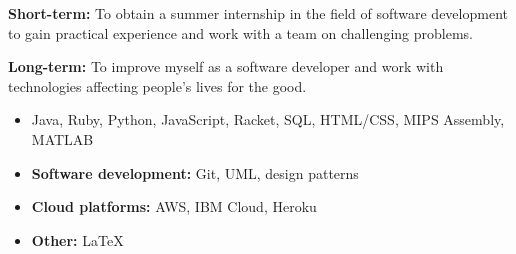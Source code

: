 \documentclass[10pt,a4paper,ragged2e]{altacv}
\begin{document}

\begin{fullwidth}
\makecvheader
\end{fullwidth}


\textbf{Short-term:} To obtain a summer internship in the field of software development to gain practical experience and work with a team on challenging problems.

\textbf{Long-term:} To improve myself as a software developer and work with technologies affecting people's lives for the good. 



\begin{itemize}
\item Java, Ruby, Python, JavaScript, Racket, SQL, HTML/CSS, MIPS Assembly, MATLAB
\end{itemize}

\begin{itemize}
\item \textbf{Software development: }Git, UML, design patterns
\item \textbf{Cloud platforms: }AWS, IBM Cloud, Heroku
\item \textbf{Other: }\LaTeX
\end{itemize}
\end{document}
